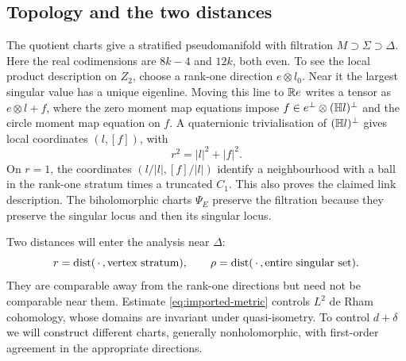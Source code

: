 \subsection{Topology and the two distances}
The quotient charts give a stratified pseudomanifold with filtration
$M\supset\Sigma\supset\Delta$. Here the real codimensions are
$8k-4$ and $12k$, both even. To see the local product description
on $Z_2$, choose a rank-one direction $e\otimes l_0$. Near it the
largest singular value has a unique eigenline. Moving this line to
$\mathbb R e$ writes a tensor as $e\otimes l+f$, where the zero moment
map equations impose $f\in e^\perp\otimes(\mathbb H l)^\perp$ and
the circle moment map equation on $f$. A quaternionic trivialisation
of $(\mathbb H l)^\perp$ gives local coordinates $(l,[f])$, with
\[
 r^2=|l|^2+|f|^2.
\]
On $r=1$, the coordinates $(l/|l|,[f]/|l|)$ identify a neighbourhood
with a ball in the rank-one stratum times a truncated $C_1$.
This also proves the claimed link description. The biholomorphic
charts $\Psi_E$ preserve the filtration because they preserve the
singular locus and then its singular locus.

Two distances will enter the analysis near $\Delta$:
\[
 r=\operatorname{dist}(\,\cdot\,,\hbox{vertex stratum}),
 \qquad \rho=\operatorname{dist}(\,\cdot\,,\hbox{entire singular set}).
\]
They are comparable away from the rank-one directions but need not
be comparable near them. Estimate \eqref{eq:imported-metric}
controls $L^2$ de Rham cohomology, whose domains are invariant under
quasi-isometry. To control $d+\delta$ we will construct different
charts, generally nonholomorphic, with first-order agreement in
the appropriate directions.
